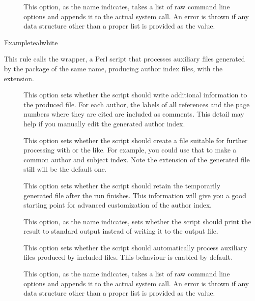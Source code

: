 \begin{description}
\begin{description}
\item[] This option, as the name indicates, takes a list of raw command line options and appends it to the actual system call. An error is thrown if any data structure other than a proper list is provided as the value.
\end{description}

\begin{codebox}{Example}{teal}{\icnote}{white}
\end{codebox}

\item[\rulebox{authorindex}]
This rule calls the  wrapper, a Perl script that processes auxiliary files generated by the package of the same name, producing author index files, with the  extension.

\begin{description}
\item[] This option sets whether the script should write additional information to the produced file. For each author, the
labels of all references and the page numbers where they are cited are included as comments. This detail may help if you manually edit the generated author index.

\item[] This option sets whether the script should create a file suitable for further processing with  or
the like. For example, you could use that to make a common author and subject index. Note the extension of the generated file still will be the default one.

\item[] This option sets whether the script should retain the temporarily generated  file after the run finishes. This information will give you a good starting point for advanced customization of the author index.

\item[] This option, as the name indicates, sets whether the script should print the result to standard output instead of writing it to the output file.

\item[] This option sets whether the script should automatically process auxiliary files produced by included files. This behaviour is enabled by default.

\item[] This option, as the name indicates, takes a list of raw command line options and appends it to the actual system call. An error is thrown if any data structure other than a proper list is provided as the value.
\end{description}


\end{description}
